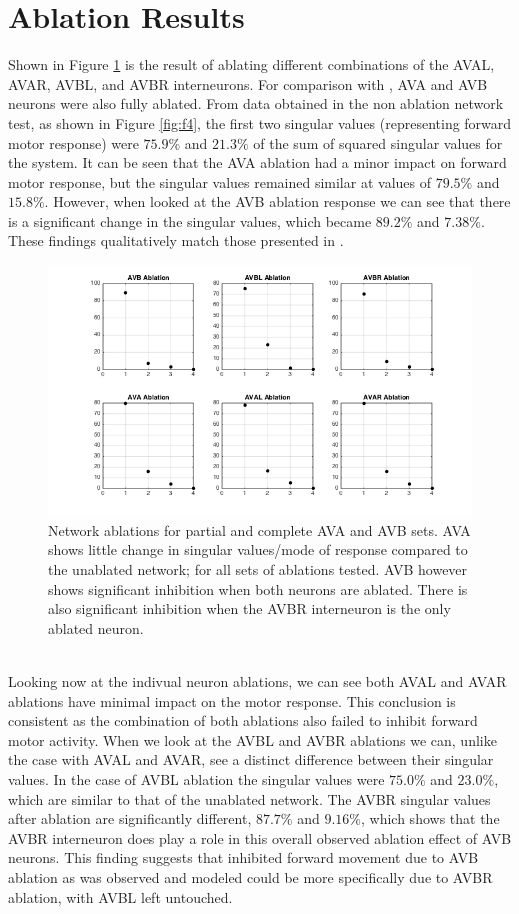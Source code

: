 \documentclass[11pt]{article} %
\begin{document}
\section{Ablation Results}
Shown in Figure \ref{fig:f5} is the result of ablating different combinations of the AVAL, AVAR, AVBL, and AVBR interneurons. For comparison with \cite{Kunert2014}, AVA and AVB neurons were also fully ablated. From data obtained in the non ablation network test, as shown in Figure \ref{fig:f4}, the first two singular values (representing forward motor response) were $75.9\%$ and $21.3\%$ of the sum of squared singular values for the system. It can be seen that the AVA ablation had a minor impact on forward motor response, but the singular values remained similar at values of $79.5\%$ and $15.8\%$. However, when looked at the AVB ablation response we can see that there is a significant change in the singular values, which became $89.2\%$ and $7.38\%$. These findings qualitatively match those presented in \cite{Kunert2014}.
\begin{figure}[h!]
\begin{center}
\includegraphics[scale=0.48]{motn_fig5.png} \caption[h4]{Network ablations for partial and complete AVA and AVB sets. AVA shows little change in singular values/mode of response compared to the unablated network; for all sets of ablations tested. AVB however shows significant inhibition when both neurons are ablated. There is also significant inhibition when the AVBR interneuron is the only ablated neuron.} \label{fig:f5} \end{center}
\end{figure} \\
Looking now at the indivual neuron ablations, we can see both AVAL and AVAR ablations have minimal impact on the motor response. This conclusion is consistent as the combination of both ablations also failed to inhibit forward motor activity. When we look at the AVBL and AVBR ablations we can, unlike the case with AVAL and AVAR, see a distinct difference between their singular values. In the case of AVBL ablation the singular values were $75.0\%$ and $23.0\%$, which are similar to that of the unablated network. The AVBR singular values after ablation are significantly different, $87.7\%$ and $9.16\%$, which shows that the AVBR interneuron does play a role in this overall observed ablation effect of AVB neurons. This finding suggests that inhibited forward movement due to AVB ablation as was observed \cite{Chalfie1985} and modeled \cite{Kunert2014} could be more specifically due to AVBR ablation, with AVBL left untouched. 
\end{document}
